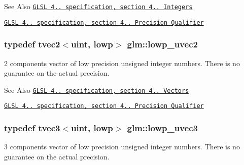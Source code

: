 \begin{DoxySeeAlso}{See Also}
\href{http://www.opengl.org/registry/doc/GLSLangSpec.4.20.8.pdf}{\tt G\-L\-S\-L 4.. specification, section 4.. Integers} 

\href{http://www.opengl.org/registry/doc/GLSLangSpec.4.20.8.pdf}{\tt G\-L\-S\-L 4.. specification, section 4.. Precision Qualifier} 
\end{DoxySeeAlso}
\hypertarget{group__core__precision_ga0eec567054355374c84c7971a07d274c}{
\subsubsection[{lowp\-\_\-uvec2}]{\setlength{\rightskip}{0pt plus 5cm}typedef tvec2$<$uint, lowp$>$ {\bf glm\-::lowp\-\_\-uvec2}}}\label{group__core__precision_ga0eec567054355374c84c7971a07d274c}
2 components vector of low precision unsigned integer numbers. There is no guarantee on the actual precision.

\begin{DoxySeeAlso}{See Also}
\href{http://www.opengl.org/registry/doc/GLSLangSpec.4.20.8.pdf}{\tt G\-L\-S\-L 4.. specification, section 4.. Vectors} 

\href{http://www.opengl.org/registry/doc/GLSLangSpec.4.20.8.pdf}{\tt G\-L\-S\-L 4.. specification, section 4.. Precision Qualifier} 
\end{DoxySeeAlso}
\hypertarget{group__core__precision_gab6f49c51783c774550f5217aecabd1d9}{
\subsubsection[{lowp\-\_\-uvec3}]{\setlength{\rightskip}{0pt plus 5cm}typedef tvec3$<$uint, lowp$>$ {\bf glm\-::lowp\-\_\-uvec3}}}\label{group__core__precision_gab6f49c51783c774550f5217aecabd1d9}
3 components vector of low precision unsigned integer numbers. There is no guarantee on the actual precision.


